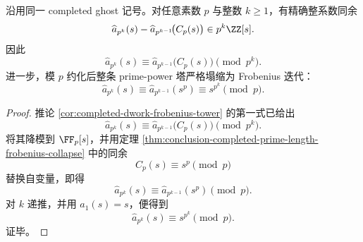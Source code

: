 \begin{theorem}\label{thm:conclusion-completed-primepower-dwork-frobenius-tower}
沿用同一 completed ghost 记号。对任意素数 \(p\) 与整数 \(k\ge 1\)，有精确整系数同余
\[
\widehat a_{p^k}(s)-\widehat a_{p^{k-1}}\!\bigl(C_p(s)\bigr)\in p^k\ZZ[s].
\]
因此
\[
\widehat a_{p^k}(s)\equiv \widehat a_{p^{k-1}}\!\bigl(C_p(s)\bigr)\pmod{p^k}.
\]
进一步，模 \(p\) 约化后整条 prime-power 塔严格塌缩为 Frobenius 迭代：
\[
\widehat a_{p^k}(s)\equiv \widehat a_{p^{k-1}}(s^p)\equiv s^{p^k}\pmod p.
\]
\end{theorem}

\begin{proof}
推论 \ref{cor:completed-dwork-frobenius-tower} 的第一式已给出
\[
\widehat a_{p^k}(s)\equiv \widehat a_{p^{k-1}}\!\bigl(C_p(s)\bigr)\pmod{p^k}.
\]
将其降模到 \(\FF_p[s]\)，并用定理
\ref{thm:conclusion-completed-prime-length-frobenius-collapse}
中的同余
\[
C_p(s)\equiv s^p\pmod p
\]
替换自变量，即得
\[
\widehat a_{p^k}(s)\equiv \widehat a_{p^{k-1}}(s^p)\pmod p.
\]
对 \(k\) 递推，并用 \(\widehat a_1(s)=s\)，便得到
\[
\widehat a_{p^k}(s)\equiv s^{p^k}\pmod p.
\]
证毕。
\end{proof}

